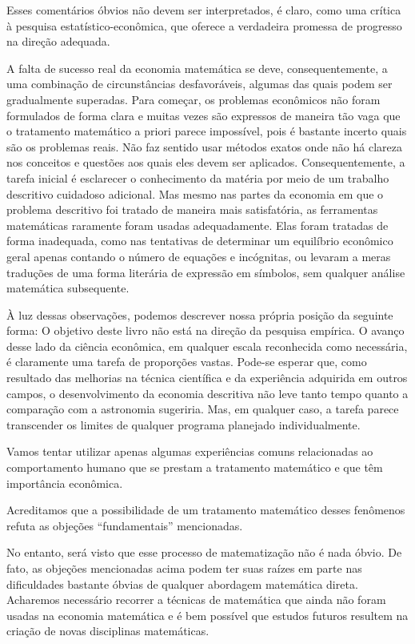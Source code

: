 \documentclass[a4paper,12pt]{article}[abntex2]
\begin{document}
Esses comentários óbvios não devem ser interpretados, é claro, como uma crítica à pesquisa estatístico-econômica, que oferece a verdadeira promessa de progresso na direção adequada.

A falta de sucesso real da economia matemática se deve, consequentemente, a uma combinação de circunstâncias desfavoráveis, algumas das quais podem ser gradualmente superadas. Para começar, os problemas econômicos não foram formulados de forma clara e muitas vezes são expressos de maneira tão vaga que o tratamento matemático a priori parece impossível, pois é bastante incerto quais são os problemas reais. Não faz sentido usar métodos exatos onde não há clareza nos conceitos e questões aos quais eles devem ser aplicados. Consequentemente, a tarefa inicial é esclarecer o conhecimento da matéria por meio de um trabalho descritivo cuidadoso adicional. Mas mesmo nas partes da economia em que o problema descritivo foi tratado de maneira mais satisfatória, as ferramentas matemáticas raramente foram usadas adequadamente. Elas foram tratadas de forma inadequada, como nas tentativas de determinar um equilíbrio econômico geral apenas contando o número de equações e incógnitas, ou levaram a meras traduções de uma forma literária de expressão em símbolos, sem qualquer análise matemática subsequente.

À luz dessas observações, podemos descrever nossa própria posição da seguinte forma: O objetivo deste livro não está na direção da pesquisa empírica. O avanço desse lado da ciência econômica, em qualquer escala reconhecida como necessária, é claramente uma tarefa de proporções vastas. Pode-se esperar que, como resultado das melhorias na técnica científica e da experiência adquirida em outros campos, o desenvolvimento da economia descritiva não leve tanto tempo quanto a comparação com a astronomia sugeriria. Mas, em qualquer caso, a tarefa parece transcender os limites de qualquer programa planejado individualmente.

Vamos tentar utilizar apenas algumas experiências comuns relacionadas ao comportamento humano que se prestam a tratamento matemático e que têm importância econômica.

Acreditamos que a possibilidade de um tratamento matemático desses fenômenos refuta as objeções “fundamentais” mencionadas.

No entanto, será visto que esse processo de matematização não é nada óbvio. De fato, as objeções mencionadas acima podem ter suas raízes em parte nas dificuldades bastante óbvias de qualquer abordagem matemática direta. Acharemos necessário recorrer a técnicas de matemática que ainda não foram usadas na economia matemática e é bem possível que estudos futuros resultem na criação de novas disciplinas matemáticas.
\end{document}
